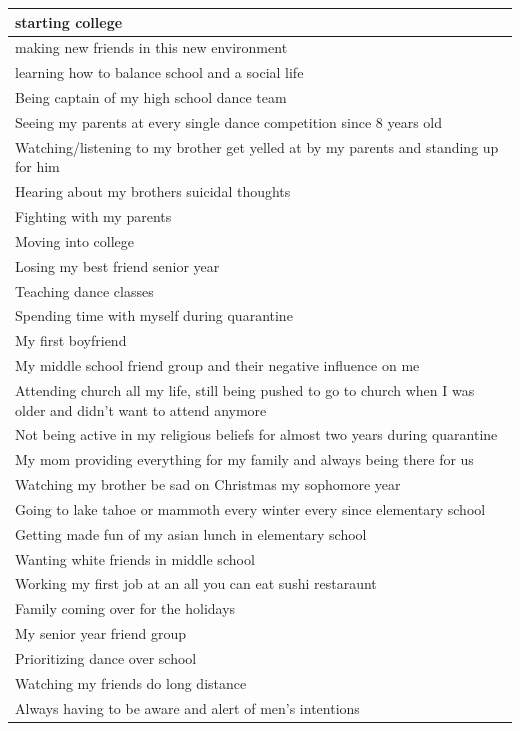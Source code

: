 \documentclass[
  .7em,
  letterpaper,
  DIV=11,
  numbers=noendperiod]{scrartcl}
\begin{document}
\begin{table}
\begin{tabular}{l}
\hline
starting college\\
\hline
making new friends in this new environment\\
\hline
learning how to balance school and a social life\\
\hline
Being captain of my high school dance team\\
\hline
Seeing my parents at every single dance competition since 8 years old\\
\hline
Watching/listening to my brother get yelled at by my parents and standing up for him\\
\hline
Hearing about my brothers suicidal thoughts\\
\hline
Fighting with my parents\\
\hline
Moving into college\\
\hline
Losing my best friend senior year\\
\hline
Teaching dance classes\\
\hline
Spending time with myself during quarantine\\
\hline
My first boyfriend\\
\hline
My middle school friend group and their negative influence on me\\
\hline
Attending church all my life, still being pushed to go to church when I was older and didn't want to attend anymore\\
\hline
Not being active in my religious beliefs for almost two years during quarantine\\
\hline
My mom providing everything for my family and always being there for us\\
\hline
Watching my brother be sad on Christmas my sophomore year\\
\hline
Going to lake tahoe or mammoth every winter every since elementary school\\
\hline
Getting made fun of my asian lunch in elementary school\\
\hline
Wanting white friends in middle school\\
\hline
Working my first job at an all you can eat sushi restaraunt\\
\hline
Family coming over for the holidays\\
\hline
My senior year friend group\\
\hline
Prioritizing dance over school\\
\hline
Watching my friends do long distance\\
\hline
Always having to be aware and alert of men's intentions\\

\end{tabular}
\end{table}
\end{document}
